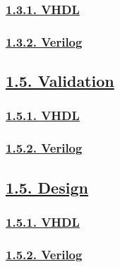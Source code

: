\documentclass[
]{article}
\begin{document}
\hypertarget{vhdl}{%
\subsubsection{\texorpdfstring{\protect\hyperlink{vhdl-3}{1.3.1.
VHDL}}{1.3.1. VHDL}}\label{vhdl}}

\hypertarget{verilog}{%
\subsubsection{\texorpdfstring{\protect\hyperlink{verilog-3}{1.3.2.
Verilog}}{1.3.2. Verilog}}\label{verilog}}

\hypertarget{validation}{%
\subsection{\texorpdfstring{\protect\hyperlink{validation-1}{1.5.
Validation}}{1.5. Validation}}\label{validation}}

\hypertarget{vhdl-1}{%
\subsubsection{\texorpdfstring{\protect\hyperlink{vhdl-5}{1.5.1.
VHDL}}{1.5.1. VHDL}}\label{vhdl-1}}

\hypertarget{verilog-1}{%
\subsubsection{\texorpdfstring{\protect\hyperlink{verilog-5}{1.5.2.
Verilog}}{1.5.2. Verilog}}\label{verilog-1}}

\hypertarget{design}{%
\subsection{\texorpdfstring{\protect\hyperlink{design-1}{1.5.
Design}}{1.5. Design}}\label{design}}

\hypertarget{vhdl-2}{%
\subsubsection{\texorpdfstring{\protect\hyperlink{vhdl-5}{1.5.1.
VHDL}}{1.5.1. VHDL}}\label{vhdl-2}}

\hypertarget{verilog-2}{%
\subsubsection{\texorpdfstring{\protect\hyperlink{verilog-5}{1.5.2.
Verilog}}{1.5.2. Verilog}}\label{verilog-2}}
\end{document}
